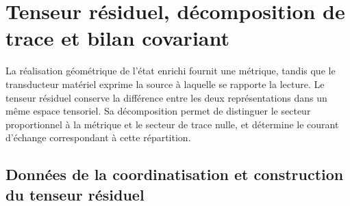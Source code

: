 %

\section{Tenseur résiduel, décomposition de trace et bilan covariant}
\label{vii:sec:tensor-residual-balance}

La réalisation géométrique de l'état enrichi fournit une métrique, tandis que le transducteur matériel exprime la source à laquelle se rapporte la lecture. Le tenseur résiduel conserve la différence entre les deux représentations dans un même espace tensoriel. Sa décomposition permet de distinguer le secteur proportionnel à la métrique et le secteur de trace nulle, et détermine le courant d'échange correspondant à cette répartition.

\subsection{Données de la coordinatisation et construction du tenseur résiduel}
\label{vii:subsec:datos-tensor-residual}

